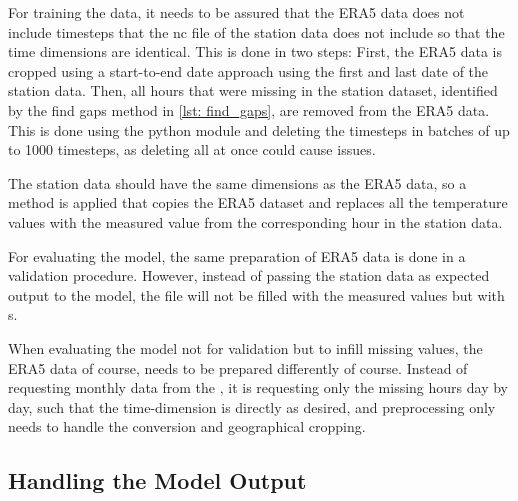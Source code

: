 For training the data, it needs to be assured that the ERA5 data does not include timesteps that the nc file of the station data does not include so that the time dimensions are identical.
This is done in two steps:
First, the ERA5 data is cropped using a start-to-end date approach using the first and last date of the station data.
Then, all hours that were missing in the station dataset, identified by the find gaps method in \autoref{lst: find_gaps}, are removed from the ERA5 data.
This is done using the python module  and deleting the timesteps in batches of up to 1000 timesteps, as deleting all at once could cause issues.

The station data should have the same dimensions as the ERA5 data, so a method is applied that copies the ERA5 dataset and replaces all the temperature values with the measured value from the corresponding hour in the station data.

For evaluating the model, the same preparation of ERA5 data is done in a validation procedure.
However, instead of passing the station data as expected output to the model, the file will not be filled with the measured values but with s.

When evaluating the model not for validation but to infill missing values, the ERA5 data of course, needs to be prepared differently of course.
Instead of requesting monthly data from the , it is requesting only the missing hours day by day, such that the time-dimension is directly as desired, and preprocessing only needs to handle the conversion and geographical cropping.

\subsection{Handling the Model Output}

